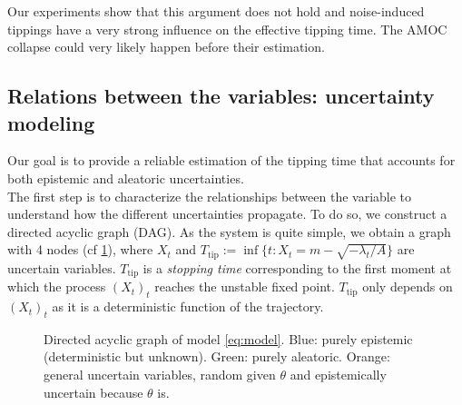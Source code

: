 \documentclass[12pt,a4paper]{article}
\theoremstyle{definition}
\theoremstyle{plain}
\newcommand{\Ttip}{T_{\mathrm{tip}}}
\begin{document}
\noindent Our experiments show that this argument does not hold and noise-induced tippings have a very strong influence on the effective tipping time. The AMOC collapse could very likely happen before their estimation. 


\subsection{Relations between the variables: uncertainty modeling}
\label{sec:dag}

Our goal is to provide a reliable estimation of the tipping time that accounts for both epistemic and aleatoric uncertainties. \\

\noindent The first step is to characterize the relationships between the variable to understand how the different uncertainties propagate. To do so, we construct a directed acyclic graph (DAG). As the system is quite simple, we obtain a graph with 4 nodes (cf \ref{fig:dag}), where $X_t$ and $\Ttip := \inf \{ t : X_t = m - \sqrt{- \lambda_t / A} \}$ are uncertain variables. $\Ttip$ is a \emph{stopping time} corresponding to the first moment at which the process $(X_t)_t$ reaches the unstable fixed point. $\Ttip$ only depends on $(X_t)_t$ as it is a deterministic function of the trajectory. \\

\begin{figure}[htbp]
\centering
{}
\caption{Directed acyclic graph of model \eqref{eq:model}. Blue: purely epistemic
(deterministic but unknown). Green: purely aleatoric. Orange: general uncertain variables,
random given $\theta$ and epistemically uncertain because $\theta$ is.}
\label{fig:dag}
\end{figure}
\end{document}

